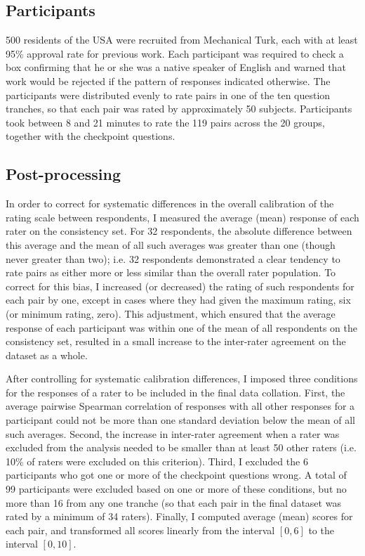 \subsection{Participants}

500 residents of the USA were recruited from Mechanical Turk, each with at least 95\% approval rate for previous work. Each participant was required to check a box confirming that he or she was a native speaker of English and warned that work would be rejected if the pattern of responses indicated otherwise. The participants were distributed evenly to rate pairs in one of the ten question tranches, so that each pair was rated by approximately 50 subjects. Participants took between 8 and 21 minutes to rate the 119 pairs across the 20 groups, together with the checkpoint questions. 

\subsection{Post-processing}

In order to correct for systematic differences in the overall calibration of the rating scale between respondents, I measured the average (mean) response of each rater on the consistency set. For 32 respondents, the absolute difference between this average and the mean of all such averages was greater than one (though never greater than two); i.e. 32 respondents demonstrated a clear tendency to rate pairs as either more or less similar than the overall rater population. To correct for this bias, I increased (or decreased) the rating of such respondents for each pair by one, except in cases where they had given the maximum rating, six (or minimum rating, zero). This adjustment, which ensured that the average response of each participant was within one of the mean of all respondents on the consistency set, resulted in a small increase to the inter-rater agreement on the dataset as a whole.     

After controlling for systematic calibration differences, I imposed three conditions for the responses of a rater to be included in the final data collation.  First, the average pairwise Spearman correlation of responses with all other responses for a participant could not be more than one standard deviation below the mean of all such averages. Second, the increase in inter-rater agreement when a rater was excluded from the analysis needed to be smaller than at least 50 other raters (i.e. 10\% of raters were excluded on this criterion). Third, I excluded the 6 participants who got one or more of the checkpoint questions wrong. A total of 99 participants were excluded based on one or more of these conditions, but no more than 16 from any one tranche (so that each pair in the final dataset was rated by a minimum of 34 raters). Finally, I computed average (mean) scores for each pair, and transformed all scores linearly from the interval \([0,6]\) to the interval \([0,10]\).

